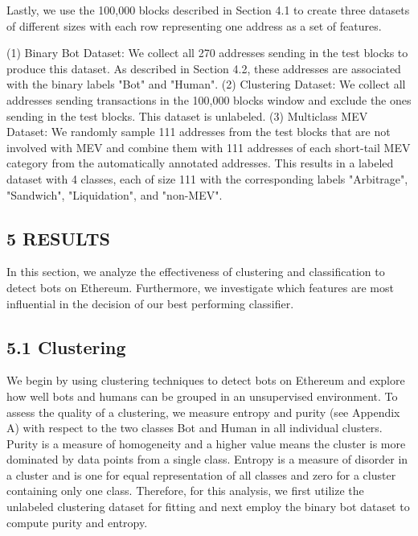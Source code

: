 Lastly, we use the 100,000 blocks described in Section 4.1 to create three datasets of different sizes with each row representing one address as a set of features.

(1) Binary Bot Dataset: We collect all 270 addresses sending in the test blocks to produce this dataset. As described in Section 4.2, these addresses are associated with the binary labels "Bot" and "Human".
(2) Clustering Dataset: We collect all addresses sending transactions in the 100,000 blocks window and exclude the ones sending in the test blocks. This dataset is unlabeled.
(3) Multiclass MEV Dataset: We randomly sample 111 addresses from the test blocks that are not involved with MEV and combine them with 111 addresses of each short-tail MEV category from the automatically annotated addresses. This results in a labeled dataset with 4 classes, each of size 111 with the corresponding labels "Arbitrage", "Sandwich", "Liquidation", and "non-MEV".

\subsection*{5 RESULTS}

In this section, we analyze the effectiveness of clustering and classification to detect bots on Ethereum. Furthermore, we investigate which features are most influential in the decision of our best performing classifier.

\subsection*{5.1 Clustering}

We begin by using clustering techniques to detect bots on Ethereum and explore how well bots and humans can be grouped in an unsupervised environment. To assess the quality of a clustering, we measure entropy and purity (see Appendix A) with respect to the two classes Bot and Human in all individual clusters. Purity is a measure of homogeneity and a higher value means the cluster is more dominated by data points from a single class. Entropy is a measure of disorder in a cluster and is one for equal representation of all classes and zero for a cluster containing only one class. Therefore, for this analysis, we first utilize the unlabeled clustering dataset for fitting and next employ the binary bot dataset to compute purity and entropy.

